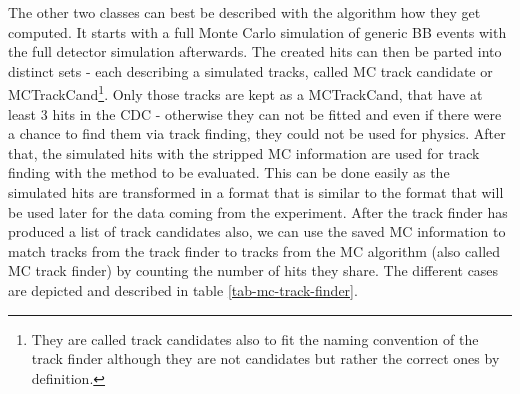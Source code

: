 The other two classes can best be described with the algorithm how they get computed. It starts with a full Monte Carlo simulation of generic BB events with the full detector simulation afterwards. The created hits can then be parted into distinct sets - each describing a simulated tracks, called MC track candidate or MCTrackCand\footnote{They are called track candidates also to fit the naming convention of the track finder although they are not candidates but rather the correct ones by definition.}. Only those tracks are kept as a MCTrackCand, that have at least 3 hits in the CDC - otherwise they can not be fitted and even if there were a chance to find them via track finding, they could not be used for physics. After that, the simulated hits with the stripped MC information are used for track finding with the method to be evaluated. This can be done easily as the simulated hits are transformed in a format that is similar to the format that will be used later for the data coming from the experiment. After the track finder has produced a list of track candidates also, we can use the saved MC information to match tracks from the track finder to tracks from the MC algorithm (also called MC track finder) by counting the number of hits they share. The different cases are depicted and described in table \ref{tab-mc-track-finder}.

